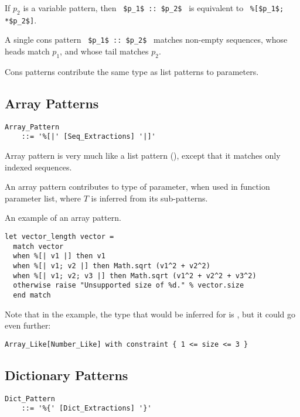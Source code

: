If $p_2$ is a variable pattern, then ~\lstinline!$p_1$ :: $p_2$!~ is equivalent to ~\lstinline!%[$p_1$; *$p_2$]!. 

A single cons pattern ~\lstinline!$p_1$ :: $p_2$!~ matches non-empty sequences, whose heads match $p_1$, and whose tail matches $p_2$. 

Cons patterns contribute the same type as list patterns to parameters. 





\subsection{Array Patterns}
\label{sec:array-patterns}

\grammar\begin{lstlisting}
Array_Pattern 
    ::= '%[|' [Seq_Extractions] '|]'
\end{lstlisting}

Array pattern is very much like a list pattern (), except that it matches only indexed sequences. 

An array pattern contributes  to type of parameter, when used in function parameter list, where $T$ is inferred from its sub-patterns. 

\example An example of an array pattern.
\begin{lstlisting}[deletekeywords={of}]
let vector_length vector = 
  match vector 
  when %[| v1 |] then v1
  when %[| v1; v2 |] then Math.sqrt (v1^2 + v2^2)
  when %[| v1; v2; v3 |] then Math.sqrt (v1^2 + v2^2 + v3^2)
  otherwise raise "Unsupported size of %d." % vector.size
  end match
\end{lstlisting}
Note that in the example, the type that would be inferred for  is , but it could go even further: 
\begin{lstlisting}
Array_Like[Number_Like] with constraint { 1 <= size <= 3 }
\end{lstlisting}





\subsection{Dictionary Patterns}
\label{sec:dict-patterns}

\grammar\begin{lstlisting}
Dict_Pattern 
    ::= '%{' [Dict_Extractions] '}'
\end{lstlisting}

